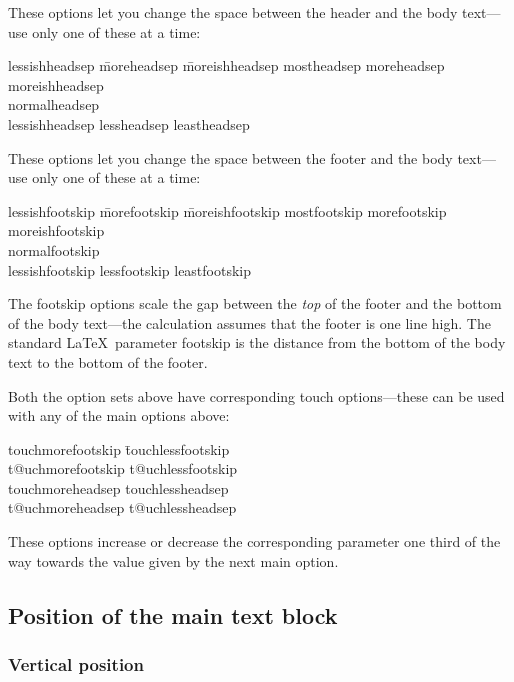 \documentclass[11pt,loose,twoside,touchwider,longish,
                      noheaders,a4paper,notstdmargins]{report}
\DeclareRobustCommand*{\comname}[1]{{\ttfamily\makeatletter\bs #1\makeatother}}
\newcommand*{\optname}[1]{{\ttfamily #1}}
\begin{document}
These options let you change the space between the header and the body
text---use only one of these at a time:
\begin{tabbing}
\optname{lessishheadsep} \=   \optname{moreheadsep} \=
\optname{moreishheadsep} \kill
\optname{mostheadsep} \>   \optname{moreheadsep} \>
\optname{moreishheadsep} \\
\optname{normalheadsep} \\
\optname{lessishheadsep} \> \optname{lessheadsep} \> \optname{leastheadsep}
\end{tabbing}

These options let you change the space between the footer and the body
text---use only one of these at a time:
\begin{tabbing}
\optname{lessishfootskip} \=   \optname{morefootskip} \=
\optname{moreishfootskip} \kill
\optname{mostfootskip} \>   \optname{morefootskip} \>
\optname{moreishfootskip} \\
\optname{normalfootskip} \\
\optname{lessishfootskip} \> \optname{lessfootskip} \> \optname{leastfootskip}
\end{tabbing}
The \optname{footskip} options scale the gap between the \emph{top} of the
footer and the bottom of the body text---the calculation assumes that
the footer is one line high.  The standard \LaTeX\ parameter
\comname{footskip} is the distance from the bottom of the body text
to the bottom of the footer.

Both the option sets above have corresponding \optname{touch}
options---these can be used with any of the main options above:
\begin{tabbing}
\optname{touchmorefootskip} \= \optname{touchlessfootskip} \\
\optname{t@uchmorefootskip} \> \optname{t@uchlessfootskip}\\
\optname{touchmoreheadsep}  \> \optname{touchlessheadsep}\\
\optname{t@uchmoreheadsep}  \> \optname{t@uchlessheadsep}
\end{tabbing}
These options increase or decrease the corresponding parameter one
third of the way towards the value given by the next main option.


\subsection{Position of the main text block}

\subsubsection{Vertical position}
\label{use:verticalpos}
\end{document}
